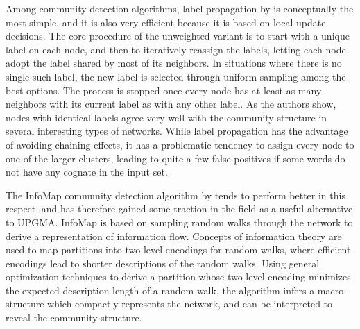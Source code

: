 Among community detection algorithms, label propagation by \cite{raghavan_ea_2007} is conceptually the most simple, and it is also very efficient because it is based on local update decisions. The core procedure of the unweighted variant is to start with a unique label on each node, and then to iteratively reassign the labels, letting each node adopt the label shared by most of its neighbors. In situations where there is no single such label, the new label is selected through uniform sampling among the best options. The process is stopped once every node has at least as many neighbors with its current label as with any other label. As the authors show, nodes with identical labels agree very well with the community structure in several interesting types of networks. While label propagation has the advantage of avoiding chaining effects, it has a problematic tendency to assign every node to one of the larger clusters, leading to quite a few false positives if some words do not 
have any cognate in the input set.

The InfoMap community detection algorithm by \cite{rosvall_bergstrom_2008} tends to perform better in this respect, and has therefore gained some traction in the field as a useful alternative to UPGMA. InfoMap is based on sampling random walks through the network to derive a representation of information flow. Concepts of information theory are used to map partitions into two-level encodings for random walks, where efficient encodings lead to shorter descriptions of the random walks. Using general optimization techniques to derive a partition whose two-level encoding minimizes the expected description length of a random walk, the algorithm infers a macro-structure which compactly represents the network, and can be interpreted to reveal the community structure.


